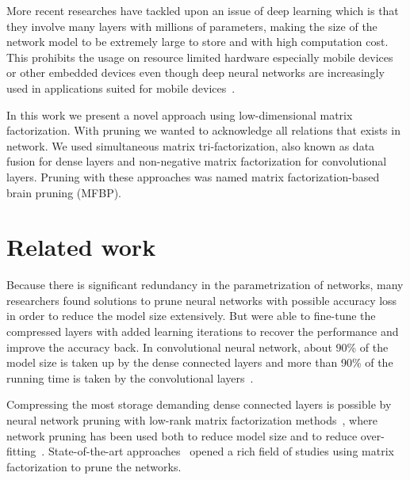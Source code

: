 \documentclass{article} %
\begin{document}
More recent researches have tackled upon an issue of deep learning which is 
that they involve many layers with
millions of parameters, making the size of the network model to be extremely
large to store and with high computation cost. This prohibits the usage on 
resource limited hardware
especially mobile devices or other embedded devices even though deep neural
networks are increasingly used in applications suited for mobile
devices~\cite{DBLP:journals/corr/GongLYB14}.

In this work we present a novel approach using low-dimensional matrix
factorization. With pruning we wanted to acknowledge all relations that exists 
in network.
We used simultaneous matrix tri-factorization, also known as data fusion for 
dense layers and non-negative matrix factorization for convolutional layers. 
Pruning with these approaches was named matrix
factorization-based brain pruning (MFBP).


\section{Related work}

Because there is significant redundancy in the parametrization of networks,
many researchers found solutions to prune neural networks with possible
accuracy loss in order to reduce the model size extensively. But were able to
fine-tune the compressed layers with added learning iterations to recover the
performance and improve the accuracy back. In convolutional neural network, 
about 90\% 
of the model size is taken up by the dense connected layers and more than 90\% 
of the running time is taken by the convolutional 
layers~\cite{zeiler2014visualizing}. 

Compressing the most storage demanding dense connected layers is possible by
neural network pruning with low-rank matrix factorization
methods~\cite{bondarenko2014artificial, schmidhuber2015deep, sainath2013low},
where network pruning has been used both to reduce model size and to reduce
over-fitting~\cite{han2015learning}. State-of-the-art 
approaches~\cite{lecun1989optimal, hassibi1993optimal} opened a rich field of 
studies using matrix factorization to prune the networks.
\end{document}
